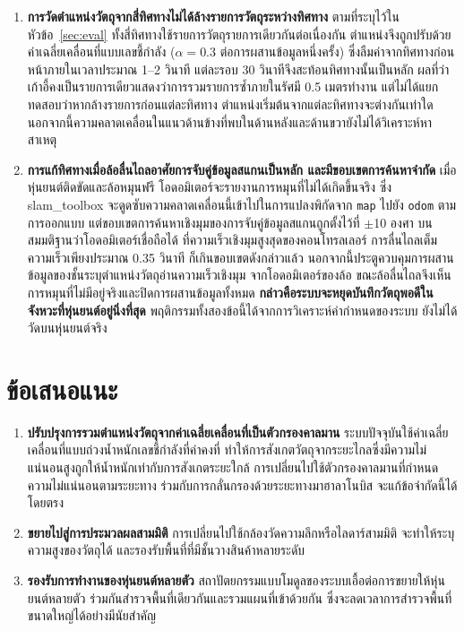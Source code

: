 \documentclass[a4paper,12pt]{report}
\begin{document}
\begin{enumerate}[label=\arabic*., leftmargin=1.25cm, itemsep=6pt, topsep=6pt]
    \item \textbf{การวัดตำแหน่งวัตถุจากสี่ทิศทางไม่ได้ล้างรายการวัตถุระหว่างทิศทาง}
    ตามที่ระบุไว้ในหัวข้อ~\ref{sec:eval} ทั้งสี่ทิศทางใช้รายการวัตถุรายการเดียวกันต่อเนื่องกัน
    ตำแหน่งจึงถูกปรับด้วยค่าเฉลี่ยเคลื่อนที่แบบเลขชี้กำลัง ($\alpha = 0.3$ ต่อการผสานข้อมูลหนึ่งครั้ง)
    ซึ่งลืมค่าจากทิศทางก่อนหน้าภายในเวลาประมาณ 1--2 วินาที
    แต่ละรอบ 30 วินาทีจึงสะท้อนทิศทางนั้นเป็นหลัก
    ผลที่ว่าเก้าอี้คงเป็นรายการเดียวแสดงว่าการรวมรายการซ้ำภายในรัศมี 0.5 เมตรทำงาน
    แต่ไม่ได้แยกทดสอบว่าหากล้างรายการก่อนแต่ละทิศทาง ตำแหน่งเริ่มต้นจากแต่ละทิศทางจะต่างกันเท่าใด
    นอกจากนี้ความคลาดเคลื่อนในแนวด้านข้างที่พบในด้านหลังและด้านขวายังไม่ได้วิเคราะห์หาสาเหตุ

    \item \textbf{การแก้ทิศทางเมื่อล้อลื่นไถลอาศัยการจับคู่ข้อมูลสแกนเป็นหลัก
    และมีขอบเขตการค้นหาจำกัด} เมื่อหุ่นยนต์ติดขัดและล้อหมุนฟรี
    โอดอมิเตอร์จะรายงานการหมุนที่ไม่ได้เกิดขึ้นจริง
    ซึ่ง slam\_toolbox จะดูดซับความคลาดเคลื่อนนี้เข้าไปในการแปลงพิกัดจาก
    \texttt{map} ไปยัง \texttt{odom} ตามการออกแบบ
    แต่ขอบเขตการค้นหาเชิงมุมของการจับคู่ข้อมูลสแกนถูกตั้งไว้ที่ $\pm$10 องศา
    บนสมมติฐานว่าโอดอมิเตอร์เชื่อถือได้
    ที่ความเร็วเชิงมุมสูงสุดของคอนโทรลเลอร์ การลื่นไถลเต็มความเร็วเพียงประมาณ 0.35 วินาที
    ก็เกินขอบเขตดังกล่าวแล้ว
    นอกจากนี้ประตูควบคุมการผสานข้อมูลของชั้นระบุตำแหน่งวัตถุอ่านความเร็วเชิงมุม
    จากโอดอมิเตอร์ของล้อ ขณะล้อลื่นไถลจึงเห็นการหมุนที่ไม่มีอยู่จริงและปิดการผสานข้อมูลทั้งหมด
    \textbf{กล่าวคือระบบจะหยุดบันทึกวัตถุพอดีในจังหวะที่หุ่นยนต์อยู่นิ่งที่สุด}
    พฤติกรรมทั้งสองข้อนี้ได้จากการวิเคราะห์ค่ากำหนดของระบบ ยังไม่ได้วัดบนหุ่นยนต์จริง
\end{enumerate}


\section{ข้อเสนอแนะ}

\begin{enumerate}[label=\arabic*., leftmargin=1.25cm, itemsep=6pt, topsep=6pt]
    \item \textbf{ปรับปรุงการรวมตำแหน่งวัตถุจากค่าเฉลี่ยเคลื่อนที่เป็นตัวกรองคาลมาน}
    ระบบปัจจุบันใช้ค่าเฉลี่ยเคลื่อนที่แบบถ่วงน้ำหนักเลขชี้กำลังที่ค่าคงที่
    ทำให้การสังเกตวัตถุจากระยะไกลซึ่งมีความไม่แน่นอนสูงถูกให้น้ำหนักเท่ากับการสังเกตระยะใกล้
    การเปลี่ยนไปใช้ตัวกรองคาลมานที่กำหนดความไม่แน่นอนตามระยะทาง
    ร่วมกับการกลั่นกรองด้วยระยะทางมาฮาลาโนบิส จะแก้ข้อจำกัดนี้ได้โดยตรง

    \item \textbf{ขยายไปสู่การประมวลผลสามมิติ}
    การเปลี่ยนไปใช้กล้องวัดความลึกหรือไลดาร์สามมิติ
    จะทำให้ระบุความสูงของวัตถุได้ และรองรับพื้นที่ที่มีชั้นวางสินค้าหลายระดับ

    \item \textbf{รองรับการทำงานของหุ่นยนต์หลายตัว}
    สถาปัตยกรรมแบบโมดูลของระบบเอื้อต่อการขยายให้หุ่นยนต์หลายตัว
    ร่วมกันสำรวจพื้นที่เดียวกันและรวมแผนที่เข้าด้วยกัน
    ซึ่งจะลดเวลาการสำรวจพื้นที่ขนาดใหญ่ได้อย่างมีนัยสำคัญ
\end{enumerate}
\end{document}
